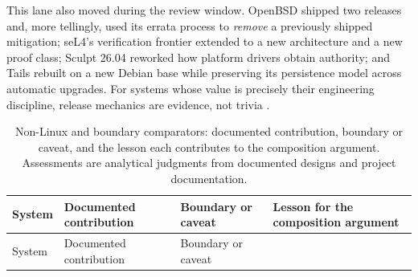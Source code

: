 \documentclass[
  english,
  9pt,
]{extarticle}
\begin{document}
This lane also moved during the review window. OpenBSD shipped two
releases and, more tellingly, used its errata process to \emph{remove} a
previously shipped mitigation; seL4's verification frontier extended to
a new architecture and a new proof class; Sculpt 26.04 reworked how
platform drivers obtain authority; and Tails rebuilt on a new Debian
base while preserving its persistence model across automatic upgrades.
For systems whose value is precisely their engineering discipline,
release mechanics are evidence, not trivia
\citep{openbsd_errata78, sel4_2026_news, sculpt_26_04, tails_7_12}.

\begin{longtable}[]{@{}
  >{\raggedright\arraybackslash}p{}
  >{\raggedright\arraybackslash}p{}
  >{\raggedright\arraybackslash}p{}
  >{\raggedright\arraybackslash}p{}@{}}
\caption{Non-Linux and boundary comparators: documented contribution,
boundary or caveat, and the lesson each contributes to the composition
argument. Assessments are analytical judgments from documented designs
and project documentation.}\label{tbl:comparators}\tabularnewline
\toprule\noalign{}
\begin{minipage}[b]{\linewidth}\raggedright
System
\end{minipage} & \begin{minipage}[b]{\linewidth}\raggedright
Documented contribution
\end{minipage} & \begin{minipage}[b]{\linewidth}\raggedright
Boundary or caveat
\end{minipage} & \begin{minipage}[b]{\linewidth}\raggedright
Lesson for the composition argument
\end{minipage} \\
\midrule\noalign{}
\endfirsthead
\toprule\noalign{}
\begin{minipage}[b]{\linewidth}\raggedright
System
\end{minipage} & \begin{minipage}[b]{\linewidth}\raggedright
Documented contribution
\end{minipage} & \begin{minipage}[b]{\linewidth}\raggedright
Boundary or caveat
\end{minipage} & \begin{minipage}[b]{\linewidth}\raggedright

\end{minipage}
\end{longtable}
\end{document}
